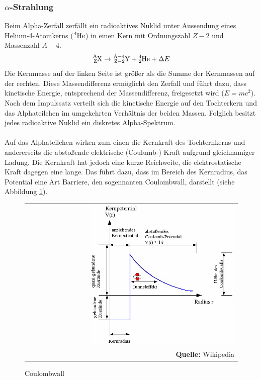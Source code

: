 \documentclass[a4paper,titlepage]{scrartcl}
\numberwithin{equation}{section}
\begin{document}
\subsubsection{$\alpha$-Strahlung}
Beim Alpha-Zerfall zerfällt ein radioaktives Nuklid unter Aussendung eines Helium-4-Atomkerns ($\ce{^{4}He}$) in einen Kern mit Ordnungszahl $Z-2$ und Massenzahl $A-4$.
\begin{equation*}
\ce{^{A}_{Z}X} \rightarrow \ce{^{A-4}_{Z-2}Y} + \ce{^{4}_{2}He} + \Delta E
\end{equation*}
Die Kernmasse auf der linken Seite ist größer als die Summe der Kernmassen auf der rechten. Diese Massendifferenz ermöglicht den Zerfall und führt dazu, dass kinetische Energie, entsprechend der Massendifferenz, freigesetzt wird ($E=mc^2$). Nach dem Impulssatz verteilt sich die kinetische Energie auf den Tochterkern und das Alphateilchen im umgekehrten Verhältnis der beiden Massen. Folglich besitzt jedes radioaktive Nuklid ein diskretes Alpha-Spektrum.\\ \\
Auf das Alphateilchen wirken zum einen die Kernkraft des Tochternkerns und andererseits die abstoßende elektrische (Coulumb-) Kraft aufgrund gleichnamiger Ladung. Die Kernkraft hat jedoch eine kurze Reichweite, die elektrostatische Kraft dagegen eine lange. Das führt dazu, dass im Bereich des Kernradius, das Potential eine Art Barriere, den sogennanten Coulombwall, darstellt (siehe Abbildung \ref{fig:coulombwall}).
\begin{figure}[H]
	\centering
	\begin{tabular}{@{}r@{}}
		\includegraphics[width=0.7\textwidth]{coulomb.png}\\
		\footnotesize\sffamily\textbf{Quelle:} Wikipedia \cite{wiki:alpha}
	\end{tabular}
	\caption{Coulombwall}
    \label{fig:coulombwall}
\end{figure}
\end{document}
